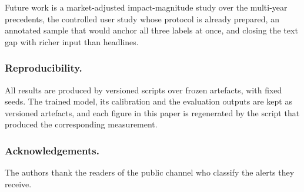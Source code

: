 \documentclass[runningheads]{llncs}
\begin{document}
Future work is a market-adjusted impact-magnitude study over the multi-year precedents, the
controlled user study whose protocol is already prepared, an annotated sample that would
anchor all three labels at once, and closing the text gap with richer input than headlines.

\subsubsection*{Reproducibility.} All results are produced by versioned scripts over frozen
artefacts, with fixed seeds. The trained model, its calibration and the evaluation outputs
are kept as versioned artefacts, and each figure in this paper is regenerated by the script
that produced the corresponding measurement.

\subsubsection*{Acknowledgements.} The authors thank the readers of the public channel who
classify the alerts they receive.
\end{document}
